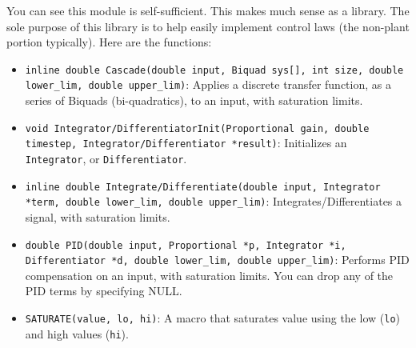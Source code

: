 \documentclass[letterpaper]{article}
\begin{document}
\begin{figure}[H]
    \centering
    \label{discrete-mdd}
\end{figure}

You can see this module is self-sufficient. This makes much sense as a library. The sole purpose of this library is to help easily implement control laws (the non-plant portion typically). Here are the functions:
\begin{itemize}
    \item \texttt{inline double Cascade(double input,
    Biquad sys[],
    int size,
    double lower\_lim,
    double upper\_lim)}: Applies a discrete transfer function, as a series of Biquads (bi-quadratics), to an input, with saturation limits.
    \item \texttt{void Integrator/DifferentiatorInit(Proportional gain,
    double timestep,
    Integrator/Differentiator *result)}: Initializes an \texttt{Integrator}, or \texttt{Differentiator}.
    \item \texttt{inline double Integrate/Differentiate(double input,
    Integrator *term,
    double lower\_lim,
    double upper\_lim)}: Integrates/Differentiates a signal, with saturation limits.
    \item \texttt{double PID(double input,
    Proportional *p,
    Integrator *i,
    Differentiator *d,
    double lower\_lim,
    double upper\_lim)}: Performs PID compensation on an input, with saturation limits. You can drop any of the PID terms by specifying NULL.
    \item \texttt{SATURATE(value, lo, hi)}: A macro that saturates value using the low (\texttt{lo}) and high values (\texttt{hi}).
\end{itemize}
\end{document}
